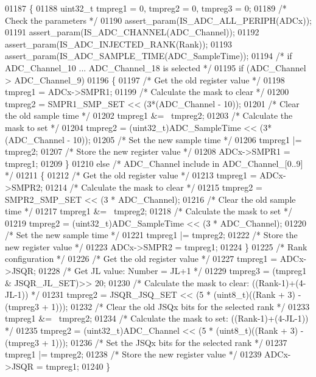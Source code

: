 \begin{DoxyCode}
01187 \{
01188   uint32\_t tmpreg1 = 0, tmpreg2 = 0, tmpreg3 = 0;
01189   \textcolor{comment}{/* Check the parameters */}
01190   assert_param(IS_ADC_ALL_PERIPH(ADCx));
01191   assert_param(IS_ADC_CHANNEL(ADC\_Channel));
01192   assert_param(IS_ADC_INJECTED_RANK(Rank));
01193   assert_param(IS_ADC_SAMPLE_TIME(ADC\_SampleTime));
01194   \textcolor{comment}{/* if ADC\_Channel\_10 ... ADC\_Channel\_18 is selected */}
01195   \textcolor{keywordflow}{if} (ADC\_Channel > ADC_Channel_9)
01196   \{
01197     \textcolor{comment}{/* Get the old register value */}
01198     tmpreg1 = ADCx->SMPR1;
01199     \textcolor{comment}{/* Calculate the mask to clear */}
01200     tmpreg2 = SMPR1_SMP_SET << (3*(ADC\_Channel - 10));
01201     \textcolor{comment}{/* Clear the old sample time */}
01202     tmpreg1 &= ~tmpreg2;
01203     \textcolor{comment}{/* Calculate the mask to set */}
01204     tmpreg2 = (uint32\_t)ADC\_SampleTime << (3*(ADC\_Channel - 10));
01205     \textcolor{comment}{/* Set the new sample time */}
01206     tmpreg1 |= tmpreg2;
01207     \textcolor{comment}{/* Store the new register value */}
01208     ADCx->SMPR1 = tmpreg1;
01209   \}
01210   \textcolor{keywordflow}{else} \textcolor{comment}{/* ADC\_Channel include in ADC\_Channel\_[0..9] */}
01211   \{
01212     \textcolor{comment}{/* Get the old register value */}
01213     tmpreg1 = ADCx->SMPR2;
01214     \textcolor{comment}{/* Calculate the mask to clear */}
01215     tmpreg2 = SMPR2_SMP_SET << (3 * ADC\_Channel);
01216     \textcolor{comment}{/* Clear the old sample time */}
01217     tmpreg1 &= ~tmpreg2;
01218     \textcolor{comment}{/* Calculate the mask to set */}
01219     tmpreg2 = (uint32\_t)ADC\_SampleTime << (3 * ADC\_Channel);
01220     \textcolor{comment}{/* Set the new sample time */}
01221     tmpreg1 |= tmpreg2;
01222     \textcolor{comment}{/* Store the new register value */}
01223     ADCx->SMPR2 = tmpreg1;
01224   \}
01225   \textcolor{comment}{/* Rank configuration */}
01226   \textcolor{comment}{/* Get the old register value */}
01227   tmpreg1 = ADCx->JSQR;
01228   \textcolor{comment}{/* Get JL value: Number = JL+1 */}
01229   tmpreg3 =  (tmpreg1 & JSQR_JL_SET)>> 20;
01230   \textcolor{comment}{/* Calculate the mask to clear: ((Rank-1)+(4-JL-1)) */}
01231   tmpreg2 = JSQR_JSQ_SET << (5 * (uint8\_t)((Rank + 3) - (tmpreg3 + 1)));
01232   \textcolor{comment}{/* Clear the old JSQx bits for the selected rank */}
01233   tmpreg1 &= ~tmpreg2;
01234   \textcolor{comment}{/* Calculate the mask to set: ((Rank-1)+(4-JL-1)) */}
01235   tmpreg2 = (uint32\_t)ADC\_Channel << (5 * (uint8\_t)((Rank + 3) - (tmpreg3 + 1)));
01236   \textcolor{comment}{/* Set the JSQx bits for the selected rank */}
01237   tmpreg1 |= tmpreg2;
01238   \textcolor{comment}{/* Store the new register value */}
01239   ADCx->JSQR = tmpreg1;
01240 \}
\end{DoxyCode}
\mbox{\label{group__ADC__Group6_ga0b583b94183fa4ff287177b9ee808092}} 
